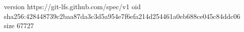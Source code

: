 version https://git-lfs.github.com/spec/v1
oid sha256:428448739c2baa87da3c3d5a954e7f6efa214d254461a0eb688ce045c84ddc06
size 67727
